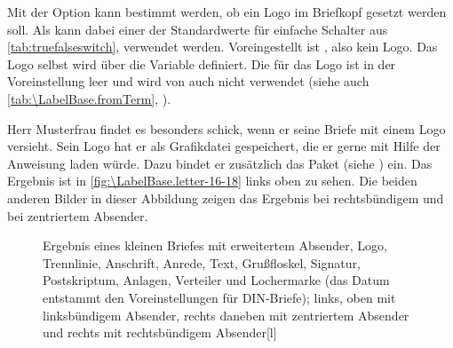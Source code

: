 \begin{Declaration}
\end{Declaration}
%
%
Mit der Option  kann bestimmt werden, ob ein Logo
im Briefkopf gesetzt werden soll. Als  kann dabei einer
der Standardwerte für einfache Schalter aus \autoref{tab:truefalseswitch},
 verwendet
werden. Voreingestellt ist , also kein
Logo. Das Logo selbst wird über die Variable 
definiert. Die  für das Logo ist in der Voreinstellung leer
und wird von \KOMAScript{} auch nicht verwendet (siehe auch
\autoref{tab:\LabelBase.fromTerm}, ).%
\begin{Example}
  Herr Musterfrau findet es besonders schick, wenn er seine Briefe mit einem
  Logo versieht. Sein Logo hat er als Grafikdatei gespeichert, die er gerne
  mit Hilfe der Anweisung  laden würde. Dazu bindet er
  zusätzlich das Paket  (siehe
  \cite{package:graphics}) ein.%
  Das Ergebnis ist in \autoref{fig:\LabelBase.letter-16-18}
  links oben zu sehen. Die beiden anderen Bilder in dieser Abbildung zeigen
  das Ergebnis bei rechtsbündigem und bei zentriertem Absender.
  \begin{figure}
     \setcapindent{0pt}%
     {\hfill
       \quad
       \par\bigskip}
     \begin{captionbeside}{Ergebnis eines kleinen Briefes mit
         erweitertem Absender, Logo, Trennlinie, Anschrift, Anrede, Text,
         Grußfloskel, Signatur, Postskriptum, Anlagen, Verteiler und
         Lochermarke (das Datum entstammt den Voreinstellungen für
         DIN-Briefe); links, oben mit linksbündigem Absender, rechts daneben
         mit zentriertem Absender und rechts mit rechtsbündigem Absender}[l]
       \quad
  \end{captionbeside}
  \label{fig:\LabelBase.letter-16-18}
  \end{figure}
\end{Example}%
%
\EndIndexGroup
\ExampleEndFix%


